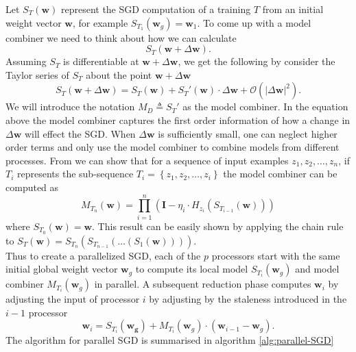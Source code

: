 Let $S_{T} \left( \bm{w} \right)$ represent the SGD computation of a training $T$ from an initial weight vector $\bm{w}$, for example $S_{T_{1}} \left( \bm{w}_{g} \right) = \bm{w}_{1}$. To come up with a model combiner we need to think about how we can calculate
\[
    S_{T} \left( \bm{w} + \Delta \bm{w} \right).
\]
Assuming $S_{T}$ is differentiable at $\bm{w} + \Delta \bm{w}$, we get the following by consider the Taylor series of $S_{T}$ about the point $\bm{w} + \Delta \bm{w}$
\[
    S_{T} \left( \bm{w} + \Delta \bm{w} \right) = S_{T} \left( \bm{w} \right) + S_{T} ' \left( \bm{w} \right) \cdot \Delta \bm{w} + \mathcal{O} \left( \left| \Delta \bm{w} \right|^{2} \right).
\]
We will introduce the notation $M_{D} \triangleq S_{T}'$ as the model combiner. In the equation above the model combiner captures the first order information of how a change in $\Delta \bm{w}$ will effect the SGD. When $\Delta \bm{w}$ is sufficiently small, one can neglect higher order terms and only use the model combiner to combine models from different processes. From \cite{MalekiSaeed2017PSGD} we can show that for a sequence of input examples $z_1 , z_2, \ldots , z_{n}$, if $T_{i}$ represents the sub-sequence $T_{i} = \left\{ z_1 , z_2, \ldots , z_{i} \right\}$ the model combiner can be computed as
\[
    M_{T_{n}} (\bm{w}) = \prod_{i=1}^{n} \left( \bm{I} - \eta_{i} \cdot H_{z_{i}} \left( S_{T_{i-1}} \left( \bm{w} \right) \right) \right)
\]
where $S_{T_{0}} \left( \bm{w} \right) = \bm{w}$. This result can be easily shown by applying the chain rule to $S_{T} \left( \bm{w} \right) = S_{T_{n}} \left( S_{T_{n-1}} \left( \ldots \left( S_{1} \left( \bm{w} \right) \right) \right) \right)$.\\[1\baselineskip]
Thus to create a parallelized SGD, each of the $p$ processors start with the same initial global weight vector $\bm{w}_{g}$ to compute its local model $S_{T_i} \left( \bm{w}_{g} \right)$ and model combiner $M_{T_{i}} \left( \bm{w}_{g} \right)$ in parallel. A subsequent reduction phase computes $\bm{w}_{i}$ by adjusting the input of processor $i$ by adjusting by the staleness introduced in the $i-1$ processor
\[
    \bm{w}_{i} = S_{T_{i}} \left( \bm{w_{g}} \right) + M_{T_{i}} \left( \bm{w}_{g} \right) \cdot \left( \bm{w}_{i-1} - \bm{w}_{g} \right).
\]
The algorithm for parallel SGD is summarised in algorithm \ref{alg:parallel-SGD}

